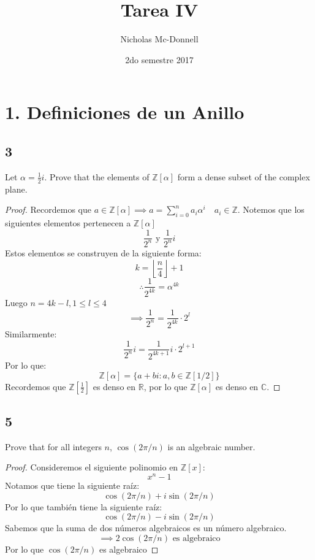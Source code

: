 \documentclass[11pt]{article}
\title{Tarea IV}
\author{Nicholas Mc-Donnell}
\date{2do semestre 2017}
\newcommand{\set}[1]{\mathbb{#1}}
\theoremstyle{definition}
\begin{document}
        \maketitle
        \newpage

        \tableofcontents
        \newpage
        \section{1. Definiciones de un Anillo}
        \subsection{3}
        Let $\alpha=\frac{1}{2}i$. Prove that the elements of $\set{Z}[\alpha]$ form a dense subset of the complex plane.
        \begin{proof}
            Recordemos que $a\in\set{Z}[\alpha]\implies a=\sum^n_{i=0}a_i\alpha^i\quad a_i\in\set{Z}$. Notemos que los siguientes elementos pertenecen a $\set{Z}[\alpha]$
            \[\frac{1}{2^n}\textrm{ y }\frac{1}{2^n}i\]
            Estos elementos se construyen de la siguiente forma:
            \[k=\left\lfloor\frac{n}{4}\right\rfloor+1\]
            \[\therefore\frac{1}{2^{4k}}=\alpha^{4k}\]
            Luego $n=4k-l, 1\leq l\leq 4$
            \[\implies\frac{1}{2^n}=\frac{1}{2^{4k}}\cdot2^l\]
            Similarmente:
            \[\frac{1}{2^n}i=\frac{1}{2^{4k+1}}i\cdot 2^{l+1}\]
            Por lo que:
            \[\set{Z}[\alpha]=\{a+bi:a,b\in\set{Z}[1/2]\}\]
            Recordemos que $\set{Z}[\frac{1}{2}]$ es denso en $\set{R}$, por lo que $\set{Z}[\alpha]$ es denso en $\set{C}$.

        \end{proof}

        \subsection{5}
        Prove that for all integers $n$, $\cos(2\pi/n)$ is an algebraic number.
        \begin{proof}
            Consideremos el siguiente polinomio en $\set{Z}[x]$:
            \[x^n-1\]
            Notamos que tiene la siguiente raíz:
            \[\cos(2\pi/n)+i\sin(2\pi/n)\]
            Por lo que también tiene la siguiente raíz:
            \[\cos(2\pi/n)-i\sin(2\pi/n)\]
            Sabemos que la suma de dos números algebraicos es un  número algebraico.
            \[\implies 2\cos(2\pi/n)\textrm{ es algebraico}\]
            Por lo que $\cos(2\pi/n)$ es algebraico
        \end{proof}
\end{document}
